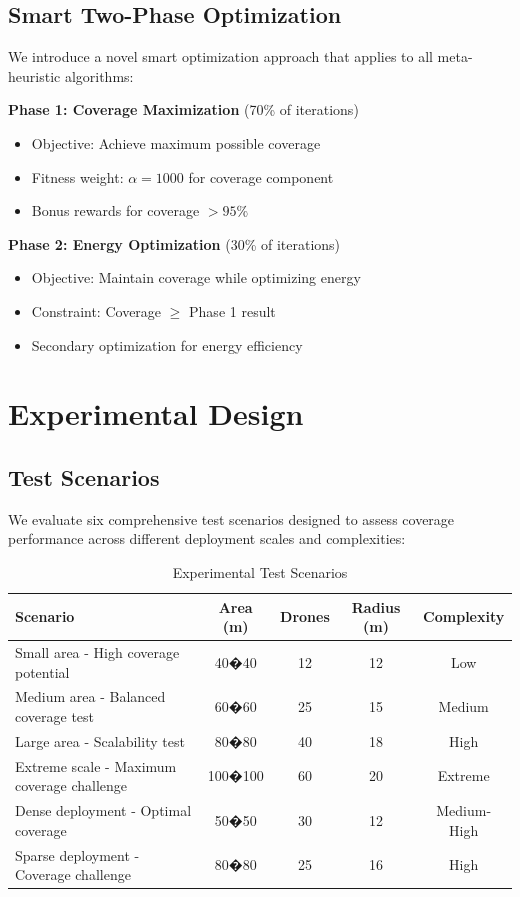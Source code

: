 \documentclass[conference]{IEEEtran}
\begin{document}
\subsection{Smart Two-Phase Optimization}
We introduce a novel smart optimization approach that applies to all meta-heuristic algorithms:

\textbf{Phase 1: Coverage Maximization} (70\% of iterations)
\begin{itemize}
\item Objective: Achieve maximum possible coverage
\item Fitness weight: $\alpha = 1000$ for coverage component
\item Bonus rewards for coverage $> 95\%$
\end{itemize}

\textbf{Phase 2: Energy Optimization} (30\% of iterations)
\begin{itemize}
\item Objective: Maintain coverage while optimizing energy
\item Constraint: Coverage $\geq$ Phase 1 result
\item Secondary optimization for energy efficiency
\end{itemize}

\section{Experimental Design}

\subsection{Test Scenarios}
We evaluate six comprehensive test scenarios designed to assess coverage performance across different deployment scales and complexities:

\begin{table}[h]
\centering
\caption{Experimental Test Scenarios}
\begin{tabular}{lcccc}
\toprule
Scenario & Area (m) & Drones & Radius (m) & Complexity \\
\midrule
Small area - High coverage potential & 40�40 & 12 & 12 & Low \\
Medium area - Balanced coverage test & 60�60 & 25 & 15 & Medium \\
Large area - Scalability test & 80�80 & 40 & 18 & High \\
Extreme scale - Maximum coverage challenge & 100�100 & 60 & 20 & Extreme \\
Dense deployment - Optimal coverage & 50�50 & 30 & 12 & Medium-High \\
Sparse deployment - Coverage challenge & 80�80 & 25 & 16 & High \\
\bottomrule
\end{tabular}
\end{table}
\end{document}
